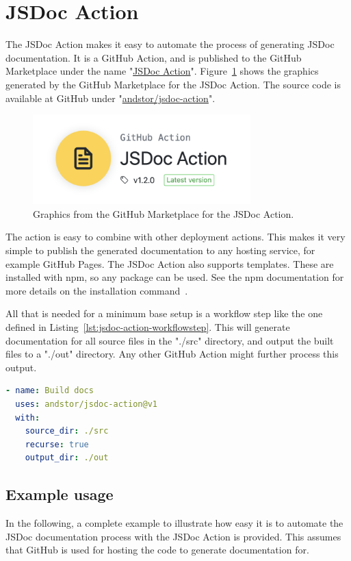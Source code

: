 \section{JSDoc Action}
\label{sec:result-jsdoc-action}
The JSDoc Action makes it easy to automate the process of generating JSDoc documentation. It is a GitHub Action, and is published to the GitHub Marketplace under the name "\href{https://github.com/marketplace/actions/jsdoc-action}{JSDoc Action}". Figure~\ref{fig:jsdoc-action-logo} shows the graphics generated by the GitHub Marketplace for the JSDoc Action. The source code is available at GitHub under "\href{https://github.com/andstor/jsdoc-action}{andstor/jsdoc-action}".
\begin{figure}[htp]
    \centering
    \includegraphics[width=0.75\textwidth]{sections/result/figures/jsdoc-action-logo.png}
    \caption{Graphics from the GitHub Marketplace for the JSDoc Action.}
    \label{fig:jsdoc-action-logo}
\end{figure}

The action is easy to combine with other deployment actions. This makes it very simple to publish the generated documentation to any hosting service, for example GitHub Pages. The JSDoc Action also supports templates. These are installed with npm, so any package can be used. See the npm documentation for more details on the installation command~\cite{npm-install-docs}.

All that is needed for a minimum base setup is a workflow step like the one defined in Listing~\ref{lst:jsdoc-action-workflowstep}. This will generate documentation for all source files in the "./src" directory, and output the built files to a "./out" directory. Any other GitHub Action might further process this output.
\begin{lstlisting}[language=yaml,caption={Basic JSDoc Action workflow step},label={lst:jsdoc-action-workflowstep}]
- name: Build docs
  uses: andstor/jsdoc-action@v1
  with:
    source_dir: ./src
    recurse: true
    output_dir: ./out
\end{lstlisting}

\subsection{Example usage}
In the following, a complete example to illustrate how easy it is to automate the JSDoc documentation process with the JSDoc Action is provided. This assumes that GitHub is used for hosting the code to generate documentation for.

